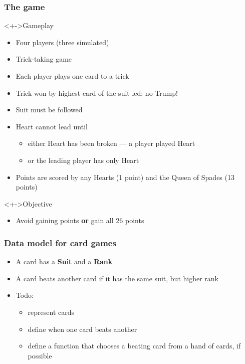 \documentclass{beamer}
\begin{document}
\begin{frame}
  \frametitle{The game}
  \begin{block}<+->{Gameplay}
    \begin{itemize}
    \item Four players (three simulated)
    \item Trick-taking game
    \item Each player plays one card to a trick
    \item Trick won by highest card of the suit led; no Trump!
    \item Suit must be followed
    \item Heart cannot lead until
      \begin{itemize}
      \item either Heart has been broken --- a player played Heart
      \item or the leading player has only Heart
      \end{itemize}
    \item Points are scored by any Hearts (1 point) and the Queen of Spades (13 points) 
    \end{itemize}
  \end{block}
  \begin{block}<+->{Objective}
    \begin{itemize}
    \item Avoid gaining points \textbf{or} gain all 26 points
    \end{itemize}
  \end{block}
  
\end{frame}
\begin{frame}
  \frametitle{Data model for card games}
  \begin{itemize}
  \item A card has a \textbf{Suit} and a \textbf{Rank}
  \item A card beats another card if it has the same suit, but higher rank
  \item Todo:
    \begin{itemize}
    \item represent cards
    \item define when one card beats another
    \item define a function that chooses a beating card from a hand of
      cards, if possible
    \end{itemize}
  \end{itemize}
\end{frame}
\end{document}

